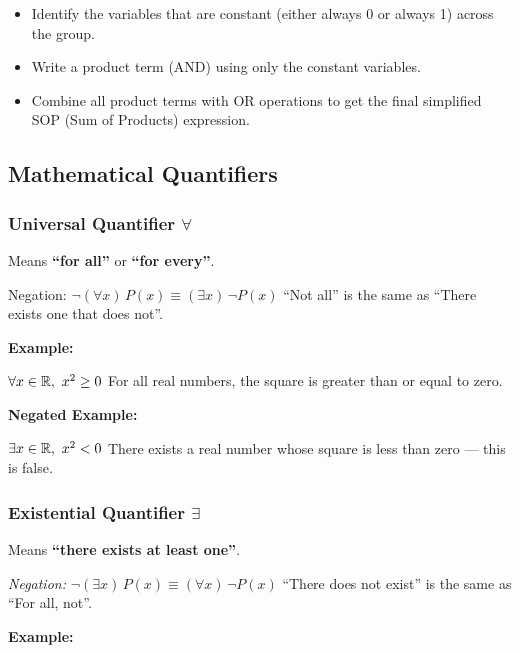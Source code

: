 \begin{enumerate}
		  \begin{itemize}

			\item Identify the variables that are constant (either always 0 or always 1) across the group.

			\item Write a product term (AND) using only the constant variables.

			\item Combine all product terms with OR operations to get the final simplified SOP (Sum of 
				  Products) expression.

		\end{itemize}

	\end{enumerate}

\subsection{Mathematical Quantifiers}

\subsubsection{Universal Quantifier \texorpdfstring{\(\forall\)}{}}  

Means \textbf{``for all''} or \textbf{``for every''}.

{Negation:} \(\neg (\forall x)\,P(x) \equiv (\exists x)\, \neg P(x)\) ``Not all'' is the same as 
``There exists one that does not''.

\textbf{Example:} 

\(\forall x \in \mathbb{R},\ x^2 \geq 0\) For all real numbers, the square is greater than or equal to zero.

\textbf{Negated Example:} 

\(\exists x \in \mathbb{R},\ x^2 < 0\) There exists a real number whose square is less than zero — this is 
false.

\subsubsection{Existential Quantifier \texorpdfstring{\(\exists\)}{}}  
	
Means \textbf{``there exists at least one''}.
 		
\emph{Negation:}  \(\neg (\exists x)\,P(x) \equiv (\forall x)\, \neg P(x)\) ``There does not exist'' is 
the same as ``For all, not''.

\textbf{Example:} 

